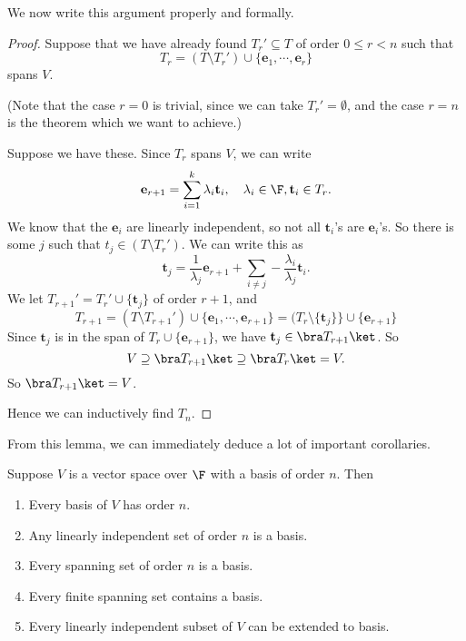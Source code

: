 \documentclass[a4paper]{article}
\begin{document}
We now write this argument properly and formally.
\begin{proof}
  Suppose that we have already found $T_r'\subseteq T$ of order $0 \leq r < n$ such that
  \[
    T_r = (T\setminus T_r') \cup \{\mathbf{e}_1, \cdots, \mathbf{e}_r\}
  \]
  spans $V$.

  (Note that the case $r = 0$ is trivial, since we can take $T_r' = \emptyset$, and the case $r = n$ is the theorem which we want to achieve.)

  Suppose we have these. Since $T_r$ spans $V$, we can write
  \[
    \mathbf{e}_{r + 1} = \sum_{i = 1}^k \lambda_i \mathbf{t}_i,\quad \lambda_i \in \F, \mathbf{t}_i \in T_r.
  \]
  We know that the $\mathbf{e}_i$ are linearly independent, so not all $\mathbf{t}_i$'s are $\mathbf{e}_i$'s. So there is some $j$ such that $t_j \in (T\setminus T_r')$. We can write this as
  \[
    \mathbf{t}_j = \frac{1}{\lambda_j} \mathbf{e}_{r + 1} + \sum_{i \not= j} -\frac{\lambda_i}{\lambda_j} \mathbf{t}_i.
  \]
  We let $T_{r + 1}' = T_r' \cup \{\mathbf{t}_j\}$ of order $r + 1$, and
  \[
    T_{r + 1} = (T\setminus T_{r + 1}') \cup \{\mathbf{e}_1, \cdots, \mathbf{e}_{r + 1}\} = (T_r \setminus \{\mathbf{t}_j\}\} \cup \{\mathbf{e}_{r + 1}\}
  \]
  Since $\mathbf{t}_j$ is in the span of $T_r\cup \{\mathbf{e}_{r + 1}\}$, we have $\mathbf{t}_j \in \bra T_{r + 1}\ket$. So
  \[
    V \supseteq \bra T_{r + 1}\ket \supseteq \bra T_r \ket = V.
  \]
  So $\bra T_{r + 1}\ket = V$.

  Hence we can inductively find $T_n$.
\end{proof}

From this lemma, we can immediately deduce a lot of important corollaries.
\begin{cor}
  Suppose $V$ is a vector space over $\F$ with a basis of order $n$. Then
  \begin{enumerate}
    \item Every basis of $V$ has order $n$.
    \item Any linearly independent set of order $n$ is a basis.
    \item Every spanning set of order $n$ is a basis.
    \item Every finite spanning set contains a basis.
    \item Every linearly independent subset of $V$ can be extended to basis.
  \end{enumerate}
\end{cor}
\end{document}
